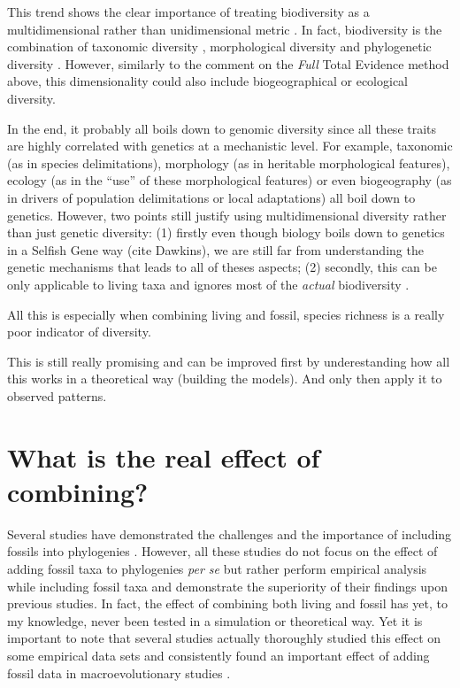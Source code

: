 This trend shows the clear importance of treating biodiversity as a multidimensional rather than unidimensional metric \citep[similarly as in ecology;][]{DonohueDim}.
In fact, biodiversity is the combination of taxonomic diversity \citep[e.g.][]{Stadler12042011}, morphological diversity \citep[from cladistics or morphometrics;][]{hetherington2015cladistic} and phylogenetic diversity \citep[e.g. the evolutionary rates regimes;][]{Close2015}.
However, similarly to the comment on the \textit{Full} Total Evidence method above, this dimensionality could also include biogeographical or ecological diversity.

In the end, it probably all boils down to genomic diversity since all these traits are highly correlated with genetics at a mechanistic level.
For example, taxonomic (as in species delimitations), morphology (as in heritable morphological features), ecology (as in the ``use'' of these morphological features) or even biogeography (as in drivers of population delimitations or local adaptations) all boil down to genetics.
However, two points still justify using multidimensional diversity rather than just genetic diversity: (1) firstly even though biology boils down to genetics in a Selfish Gene way (cite Dawkins), we are still far from understanding the genetic mechanisms that leads to all of theses aspects; (2) secondly, this can be only applicable to living taxa and ignores most of the \textit{actual} biodiversity \citep{novacek1992ext,raup1993extinction}.

All this is especially when combining living and fossil, species richness is a really poor indicator of diversity.

This is still really promising and can be improved first by underestanding how all this works in a theoretical way (building the models).
And only then apply it to observed patterns.

\section{What is the real effect of combining?}
Several studies have demonstrated the challenges and the importance of including fossils into phylogenies \citep[e.g.][]{ronquista2012,slaterphylogenetic2013,Wood01032013,beckancient2014,Dembo2015}.
However, all these studies do not focus on the effect of adding fossil taxa to phylogenies \textit{per se} but rather perform empirical analysis while including fossil taxa and demonstrate the superiority of their findings upon previous studies.
In fact, the effect of combining both living and fossil has yet, to my knowledge, never been tested in a simulation or theoretical way.
Yet it is important to note that several studies actually thoroughly studied this effect on some empirical data sets and consistently found an important effect of adding fossil data in macroevolutionary studies \citep{Finarelli2006,Slateretal2012,slaterphylogenetic2013,SlaterPennel2014,pant2014complex,Mitchell2015}.

